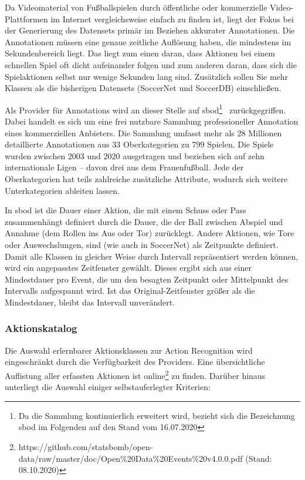 Da Videomaterial von Fußballspielen durch öffentliche oder kommerzielle Video-Plattformen im Internet vergleichsweise einfach zu finden ist, liegt der Fokus bei der Generierung des Datensets primär im Beziehen akkurater Annotationen.
Die Annotationen müssen eine genaue zeitliche Auflösung haben, die mindestens im Sekundenbereich liegt.
Das liegt zum einen daran, dass Aktionen bei einem schnellen Spiel oft dicht aufeinander folgen und zum anderen daran, dass sich die Spielaktionen selbst nur wenige Sekunden lang sind.
Zusätzlich sollen Sie mehr Klassen als die bisherigen Datensets (SoccerNet und SoccerDB) einschließen.

Als Provider für Annotations wird an dieser Stelle auf \gls{sbod}\footnote{Da die Sammlung kontinuierlich erweitert wird, bezieht sich die Bezeichnung \gls{sbod} im Folgenden auf den Stand vom 16.07.2020}~\cite{Statsbomb20} zurückgegriffen.
Dabei handelt es sich um eine frei nutzbare Sammlung professioneller Annotation eines kommerziellen Anbieters.
Die Sammlung umfasst mehr als 28 Millionen detaillierte Annotationen aus 33 Oberkategorien zu 799 Spielen.
Die Spiele wurden zwischen 2003 und 2020 ausgetragen und beziehen sich auf zehn internationale Ligen -- davon drei aus dem Frauenfußball.
Jede der Oberkategorien hat teils zahlreiche zusätzliche Attribute, wodurch sich weitere Unterkategorien ableiten lassen.

In \gls{sbod} ist die Dauer einer Aktion, die mit einem Schuss oder Pass zusammenhängt definiert durch die Dauer, die der Ball zwischen Abspiel und Annahme (\bzw dem Rollen ins Aus oder Tor) zurücklegt.
Andere Aktionen, wie Tore oder Auswechslungen, sind (wie auch in SoccerNet) als Zeitpunkte definiert.
Damit alle Klassen in gleicher Weise durch Intervall repräsentiert werden können, wird ein angepasstes Zeitfenster gewählt.
Dieses ergibt sich aus einer Mindestdauer pro Event, die um den besagten Zeitpunkt oder Mittelpunkt des Intervalls aufgespannt wird.
Ist das Original-Zeitfenster größer als die Mindestdauer, bleibt das Intervall unverändert.

\subsubsection*{Aktionskatalog}

Die Auswahl erlernbarer Aktionsklassen zur Action Recognition wird eingeschränkt durch die Verfügbarkeit des Providers.
Eine übersichtliche Auflistung aller erfassten Aktionen ist online\footnote{https://github.com/statsbomb/open-data/raw/master/doc/Open\%20Data\%20Events\%20v4.0.0.pdf (Stand: 08.10.2020)} zu finden.
Darüber hinaus unterliegt die Auswahl einiger selbstauferlegter Kriterien:

